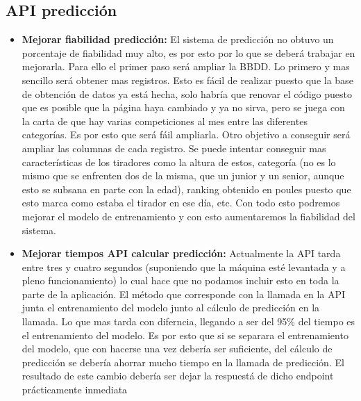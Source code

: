 \subsection{API predicción}
\begin{itemize}
  \item \textbf{Mejorar fiabilidad predicción:} El sistema de predicción no obtuvo un
    porcentaje de fiabilidad muy alto, es por esto por lo que se deberá trabajar
    en mejorarla. Para ello el primer paso será ampliar la BBDD. Lo primero y mas sencillo
    será obtener mas registros. Esto es fácil de realizar puesto que la base de obtención
    de datos ya está hecha, solo habría que renovar el código puesto que es posible
    que la página haya cambiado y ya no sirva, pero se juega con la carta de que
    hay varias competiciones al mes entre las diferentes categorías. Es por esto
    que será fáil ampliarla. Otro objetivo a conseguir será ampliar las columnas
    de cada registro. Se puede intentar conseguir mas características de los tiradores
    como la altura de estos, categoría (no es lo mismo que se enfrenten dos de la misma,
    que un junior y un senior, aunque esto se subsana en parte con la edad), ranking
    obtenido en poules puesto que esto marca como estaba el tirador en ese día, etc.
    Con todo esto podremos mejorar el modelo de entrenamiento y con esto aumentaremos
    la fiabilidad del sistema.

  \item \textbf{Mejorar tiempos API calcular predicción:} Actualmente la API tarda entre
    tres y cuatro segundos (suponiendo que la máquina esté levantada y a pleno funcionamiento)
    lo cual hace que no podamos incluir esto en toda la parte de la aplicación. El método
    que corresponde con la llamada en la API junta el entrenamiento del modelo junto
    al cálculo de predicción en la llamada. Lo que mas tarda con diferncia, llegando a ser
    del 95\% del tiempo es el entrenamiento del modelo. Es por esto que si se separara
    el entrenamiento del modelo, que con hacerse una vez debería ser suficiente, del
    cálculo de predicción se debería ahorrar mucho tiempo en la llamada de predicción.
    El resultado de este cambio debería ser dejar la respuestá de dicho endpoint prácticamente
    inmediata
\end{itemize}

